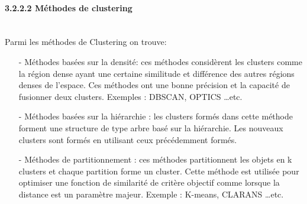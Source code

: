 \paragraph{{\large 3.2.2.2 Méthodes de clustering}\\\\}
Parmi les méthodes de Clustering on trouve:\\
\begin{itemize}
\item[-]Méthodes basées sur la densité: ces méthodes considèrent les clusters comme la région dense ayant une certaine similitude et différence des autres régions denses de l'espace. Ces méthodes ont une bonne précision et la capacité de fusionner deux clusters. Exemples : DBSCAN, OPTICS …etc.\\
\item[-]Méthodes basées sur la hiérarchie : les clusters formés dans cette méthode forment une structure de type arbre basé sur la hiérarchie. Les nouveaux clusters sont formés en utilisant ceux précédemment formés.\\
\item[-]Méthodes de partitionnement : ces méthodes partitionnent les objets en k clusters et chaque partition forme un cluster. Cette méthode est utilisée pour optimiser une fonction de similarité de critère objectif comme lorsque la distance est un paramètre majeur. Exemple : K-means, CLARANS …etc.
\end{itemize}

